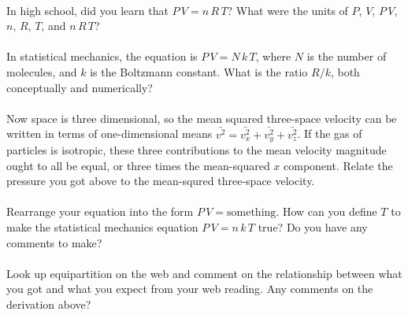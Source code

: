 \documentclass[12pt]{article}
\begin{document}
\paragraph{\theproblem}%
In high school, did you learn that $P\,V = n\,R\,T$? What were the
units of $P$, $V$, $P\,V$, $n$, $R$, $T$, and $n\,R\,T$?

\paragraph{\theproblem}%
In statistical mechanics, the equation is $P\,V = N\,k\,T$, where $N$
is the number of molecules, and $k$ is the Boltzmann constant. What is
the ratio $R/k$, both conceptually and numerically?

\paragraph{\theproblem}%
Now space is three dimensional, so the mean squared three-space
velocity can be written in terms of one-dimensional means $\bar{v^2} =
\bar{v_x^2} + \bar{v_y^2} + \bar{v_z^2}$. If the gas of particles is
isotropic, these three contributions to the mean velocity magnitude
ought to all be equal, or three times the mean-squared $x$ component.
Relate the pressure you got above to the mean-squred three-space velocity.

\paragraph{\theproblem}%
Rearrange your equation into the form $P\,V=\mbox{something}$. How can
you define $T$ to make the statistical mechanics equation $P\,V =
n\,k\,T$ true? Do you have any comments to make?

\paragraph{\theproblem}%
Look up equipartition on the web and comment on the relationship
between what you got and what you expect from your web reading. Any
comments on the derivation above?
\end{document}
